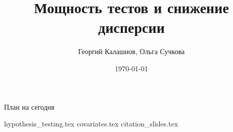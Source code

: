\documentclass[handout,12pt]{beamer}
\title{Мощность тестов и снижение дисперсии}
\author[Георгий Калашнов, Ольга Сучкова]{Георгий Калашнов, Ольга Сучкова}
\date{\today}
\begin{document}
\begin{frame}
  \titlepage
  \begin{flushright}
  \end{flushright}
\end{frame}

\begin{frame}{План на сегодня} 
\tableofcontents
\end{frame}

{hypothesis_testing.tex}
{covariates.tex}
{citation_slides.tex}
\end{document}
